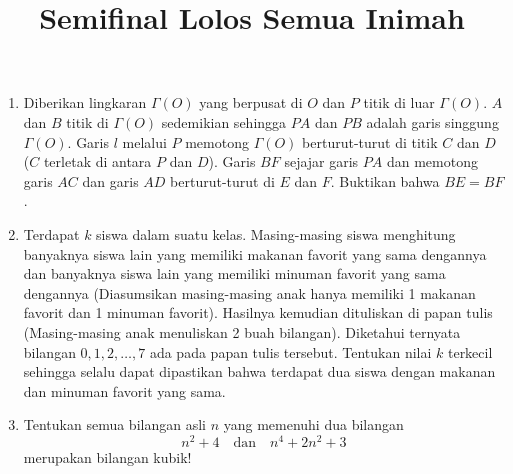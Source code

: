 \documentclass[12pt]{scrartcl}
\begin{document}
\title{Semifinal Lolos Semua Inimah}
\maketitle

\renewcommand*\contentsname{Daftar Isi}
\tableofcontents

\newpage
\begin{enumerate}
    \item Diberikan lingkaran $\Gamma(O)$ yang berpusat di $O$ dan $P$ titik di luar $\Gamma(O)$. $A$ dan $B$ titik di $\Gamma(O)$ sedemikian sehingga $PA$ dan $PB$ adalah garis singgung $\Gamma(O)$. Garis $l$ melalui $P$ memotong $\Gamma(O)$ berturut-turut di titik $C$ dan $D$ ($C$ terletak di antara $P$ dan $D$). Garis $BF$ sejajar garis $PA$ dan memotong garis $AC$ dan garis $AD$ berturut-turut di $E$ dan $F$. Buktikan bahwa $BE = BF$.

    \item Terdapat $k$ siswa dalam suatu kelas. Masing-masing siswa menghitung banyaknya siswa lain yang memiliki makanan favorit yang sama dengannya dan banyaknya siswa lain yang memiliki minuman favorit yang sama dengannya (Diasumsikan masing-masing anak hanya memiliki 1 makanan favorit dan 1 minuman favorit). Hasilnya kemudian dituliskan di papan tulis (Masing-masing anak menuliskan 2 buah bilangan). Diketahui ternyata bilangan $0, 1, 2, \dots , 7$ ada pada papan tulis tersebut. Tentukan nilai $k$ terkecil sehingga selalu dapat dipastikan bahwa terdapat dua siswa dengan makanan dan minuman favorit yang sama.

    \item Tentukan semua bilangan asli $n$ yang memenuhi dua bilangan 
    \[ n^2+4 \quad \text{dan} \quad n^4+2n^2+3 \]
    merupakan bilangan kubik!
\end{enumerate}
\end{document}
